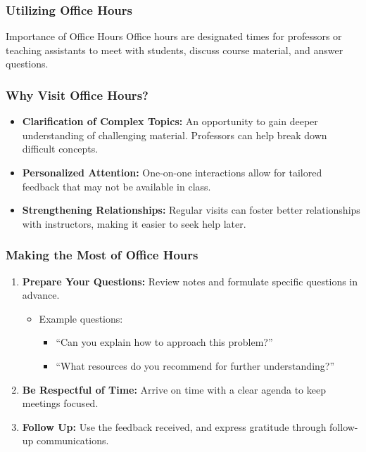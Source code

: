 \documentclass[aspectratio=169]{beamer}
\begin{document}
\begin{frame}[fragile]
    \frametitle{Utilizing Office Hours}
    \begin{block}{Importance of Office Hours}
        Office hours are designated times for professors or teaching assistants to meet with students, discuss course material, and answer questions.
    \end{block}
\end{frame}

\begin{frame}[fragile]
    \frametitle{Why Visit Office Hours?}
    \begin{itemize}
        \item \textbf{Clarification of Complex Topics:} 
        An opportunity to gain deeper understanding of challenging material. Professors can help break down difficult concepts.
        
        \item \textbf{Personalized Attention:} 
        One-on-one interactions allow for tailored feedback that may not be available in class.
        
        \item \textbf{Strengthening Relationships:} 
        Regular visits can foster better relationships with instructors, making it easier to seek help later.
    \end{itemize}
\end{frame}

\begin{frame}[fragile]
    \frametitle{Making the Most of Office Hours}
    \begin{enumerate}
        \item \textbf{Prepare Your Questions:} 
            Review notes and formulate specific questions in advance.
            \begin{itemize}
                \item Example questions:
                \begin{itemize}
                    \item ``Can you explain how to approach this problem?''
                    \item ``What resources do you recommend for further understanding?''
                \end{itemize}
            \end{itemize}

        \item \textbf{Be Respectful of Time:} 
            Arrive on time with a clear agenda to keep meetings focused.

        \item \textbf{Follow Up:} 
            Use the feedback received, and express gratitude through follow-up communications.
    \end{enumerate}    
\end{frame}
\end{document}
